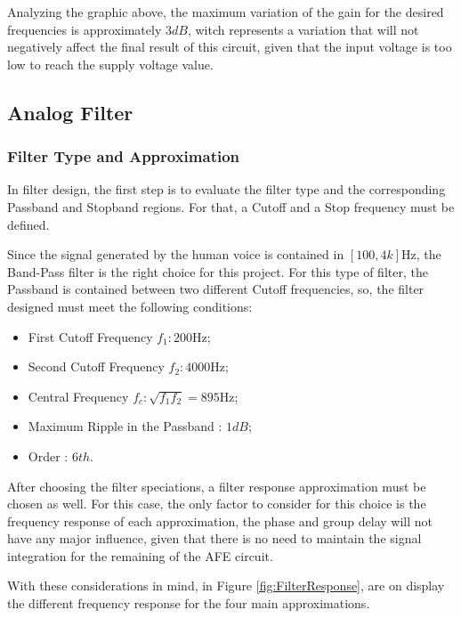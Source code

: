 Analyzing the graphic above, the maximum variation of the gain for the desired frequencies is approximately $3dB$, witch represents a variation that will not negatively affect the final result of this circuit, given that the input voltage is too low to reach the supply voltage value.

\subsection{Analog Filter}

\subsubsection{Filter Type and Approximation}

In filter design, the first step is to evaluate the filter type and the corresponding Passband and Stopband regions. For that, a Cutoff and a Stop frequency must be defined.

Since the signal generated by the human voice is contained in $[100, 4k]\si{\hertz}$, the Band-Pass filter is the right choice for this project. For this type of filter, the Passband is contained between two different Cutoff frequencies, so, the filter designed must meet the following conditions:

\begin{itemize}
    \item First Cutoff Frequency $f_1: 200\si{\hertz}$;
    \item Second Cutoff Frequency $f_2: 4000\si{\hertz}$;
    \item Central Frequency $f_c: \sqrt{f_1 f_2} = 895 \si{\hertz}$;
    \item Maximum Ripple in the Passband : $1dB$;
    \item Order : $6th$.
\end{itemize}

After choosing the filter speciations, a filter response approximation must be chosen as well. For this case, the only factor to consider for this choice is the frequency response of each approximation, the phase and group delay will not have any major influence, given that there is no need to maintain the signal integration for the remaining of the AFE circuit.

With these considerations in mind, in Figure \ref{fig:FilterResponse}, are on display the different frequency response for the four main approximations.

